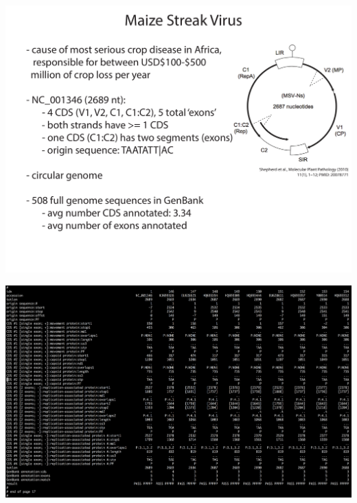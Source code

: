 \documentclass[landscape]{slides}
\begin{document}
\begin{slide}
\begin{center}

\includegraphics[width=10in]{figs/msv-slide}

\end{center}
\vfill
\end{slide}
\begin{slide}
\begin{center}

\includegraphics[width=10in]{figs/msv-tbl-screenshot}

\end{center}
\vfill
\end{slide}
\end{document}

